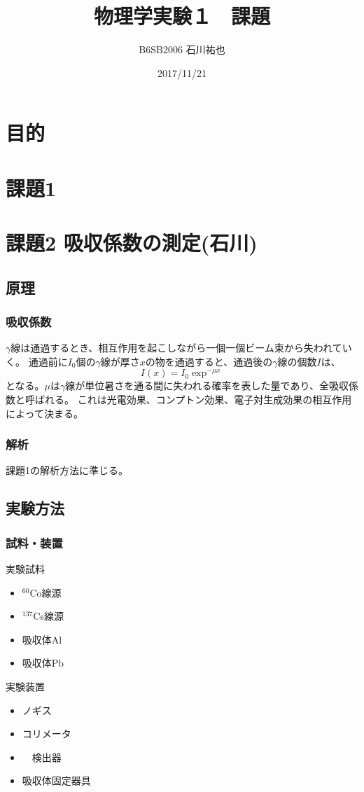 \documentclass[a4paper,12pt]{jarticle}
\title{物理学実験１　課題}
\author{B6SB2006  石川祐也}
\date{2017/11/21}
\begin{document}
\section{目的}

\section{課題1}

\newpage

\section{課題2 吸収係数の測定(石川)}
 \subsection{原理}
 \subsubsection{吸収係数}
 $\gamma$線は通過するとき、相互作用を起こしながら一個一個ビーム束から失われていく。
 通過前に$I_0$個の$\gamma$線が厚さ$x$の物を通過すると、通過後の$\gamma$線の個数$I$は、
 $$I(x)=I_0 \exp^{-\mu x}$$
 となる。$\mu$は$\gamma$線が単位暑さを通る間に失われる確率を表した量であり、全吸収係数と呼ばれる。
 これは光電効果、コンプトン効果、電子対生成効果の相互作用によって決まる。

 \subsubsection{解析}
 課題1の解析方法に準じる。

 \subsection{実験方法}
  \subsubsection{試料・装置}
   実験試料
   \begin{itemize}
    \item $^{60}$Co線源
    \item $^{137}$Cs線源
    \item 吸収体Al
    \item 吸収体Pb
   \end{itemize}

   実験装置
    \begin{itemize}
     \item ノギス
     \item コリメータ
     \item　検出器
     \item 吸収体固定器具
    \end{itemize}
\end{document}
